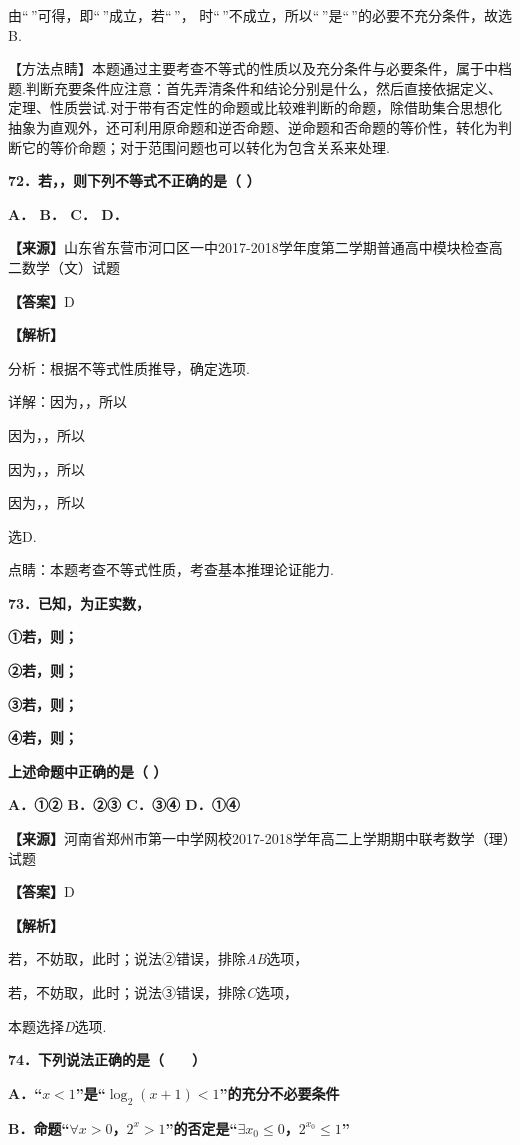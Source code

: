 由``\,''可得，即``\,''成立，若``\,''，
时``\,''不成立，所以``\,''是``\,''的必要不充分条件，故选B.

【方法点睛】本题通过主要考查不等式的性质以及充分条件与必要条件，属于中档题.判断充要条件应注意：首先弄清条件和结论分别是什么，然后直接依据定义、定理、性质尝试.对于带有否定性的命题或比较难判断的命题，除借助集合思想化抽象为直观外，还可利用原命题和逆否命题、逆命题和否命题的等价性，转化为判断它的等价命题；对于范围问题也可以转化为包含关系来处理.

\textbf{72．若，，则下列不等式不正确的是（ ）}

\textbf{A． B． C． D．}

\textbf{【来源】}山东省东营市河口区一中2017-2018学年度第二学期普通高中模块检查高二数学（文）试题

\textbf{【答案】}D

\textbf{【解析】}

分析：根据不等式性质推导，确定选项.

详解：因为，，所以

因为，，所以

因为，，所以

因为，，所以

选D.

点睛：本题考查不等式性质，考查基本推理论证能力.

\textbf{73．已知，为正实数，}

\textbf{①若，则；}

\textbf{②若，则；}

\textbf{③若，则；}

\textbf{④若，则；}

\textbf{上述命题中正确的是（ ）}

\textbf{A．①② B．②③ C．③④ D．①④}

\textbf{【来源】}河南省郑州市第一中学网校2017-2018学年高二上学期期中联考数学（理）试题

\textbf{【答案】}D

\textbf{【解析】}

若，不妨取，此时；说法②错误，排除\emph{AB}选项，

若，不妨取，此时；说法③错误，排除\emph{C}选项，

本题选择\emph{D}选项.

\textbf{74．下列说法正确的是（　　）}

\textbf{A．``}\(x < 1\)\textbf{''是``}\(\log_{2}\left( x + 1 \right) < 1\)\textbf{''的充分不必要条件}

\textbf{B．命题``}\(\forall x > 0\)\textbf{，}\(2^{x} > 1\)\textbf{''的否定是``}\(\exists x_{0} \leq 0\)\textbf{，}\(2^{x_{0}} \leq 1\)\textbf{''}


